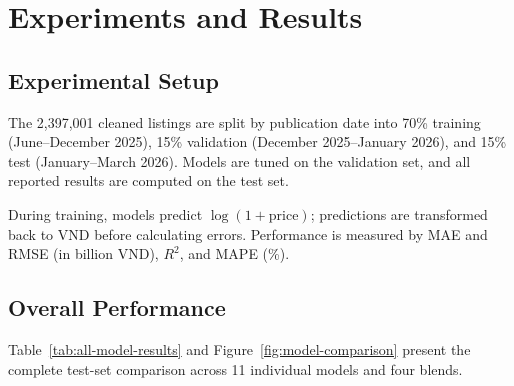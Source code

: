\section{Experiments and Results}
\label{sec:experiments}
\label{sec:model-evaluation}
\begingroup
\setlength{\emergencystretch}{3em}

\subsection{Experimental Setup}
\label{subsec:exp-setup}

The 2,397,001 cleaned listings are split by publication date into 70\% training (June--December 2025), 15\% validation (December 2025--January 2026), and 15\% test (January--March 2026). Models are tuned on the validation set, and all reported results are computed on the test set.

During training, models predict $\log(1 + \text{price})$; predictions are transformed back to VND before calculating errors. Performance is measured by MAE and RMSE (in billion VND), $R^2$, and MAPE (\%).

\subsection{Overall Performance}
\label{subsec:overall-results}

Table~\ref{tab:all-model-results} and Figure~\ref{fig:model-comparison} present the complete test-set comparison across 11 individual models and four blends.

